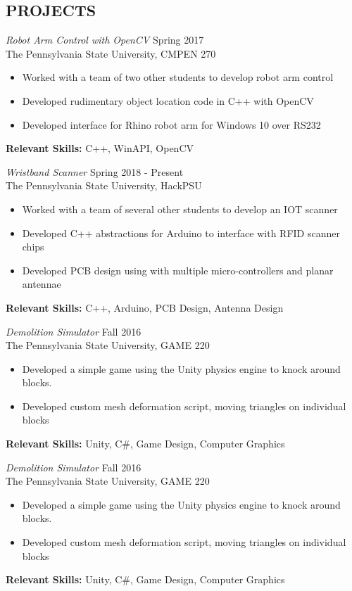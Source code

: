 \documentclass[line,margin]{res}
\begin{document}
\begin{resume}
		\newpage
		\section{PROJECTS}
		{\sl Robot Arm Control with OpenCV} \hfill Spring 2017\\
		The Pennsylvania State University, CMPEN 270
		\begin{itemize}  \itemsep -2pt
			\item Worked with a team of two other students to develop robot arm control
			\item Developed rudimentary object location code in C++ with OpenCV
			\item Developed interface for Rhino robot arm for Windows 10 over RS232 
			\vspace*{-\baselineskip}		
		\end{itemize}
		\textbf{Relevant Skills:} C++, WinAPI, OpenCV
		\newline
		
		{\sl Wristband Scanner} \hfill Spring 2018 - Present\\
		The Pennsylvania State University, HackPSU
		\begin{itemize}  \itemsep -2pt
			\item Worked with a team of several other students to develop an IOT scanner
			\item Developed C++ abstractions for Arduino to interface with RFID scanner chips
			\item Developed PCB design using with multiple micro-controllers and planar antennae
			\vspace*{-\baselineskip}		
		\end{itemize}
		\textbf{Relevant Skills:} C++, Arduino, PCB Design, Antenna Design
		
		{\sl Demolition Simulator} \hfill Fall 2016\\
		The Pennsylvania State University, GAME 220
		\begin{itemize}  \itemsep -2pt
			\item Developed a simple game using the Unity physics engine to knock around blocks.
			\item Developed custom mesh deformation script, moving triangles on individual blocks
			\vspace*{-\baselineskip}		
		\end{itemize}
		\textbf{Relevant Skills:} Unity, C\#, Game Design, Computer Graphics
		
		{\sl Demolition Simulator} \hfill Fall 2016\\
		The Pennsylvania State University, GAME 220
		\begin{itemize}  \itemsep -2pt
			\item Developed a simple game using the Unity physics engine to knock around blocks.
			\item Developed custom mesh deformation script, moving triangles on individual blocks
			\vspace*{-\baselineskip}		
		\end{itemize}
		\textbf{Relevant Skills:} Unity, C\#, Game Design, Computer Graphics
		

\end{resume}
\end{document}
